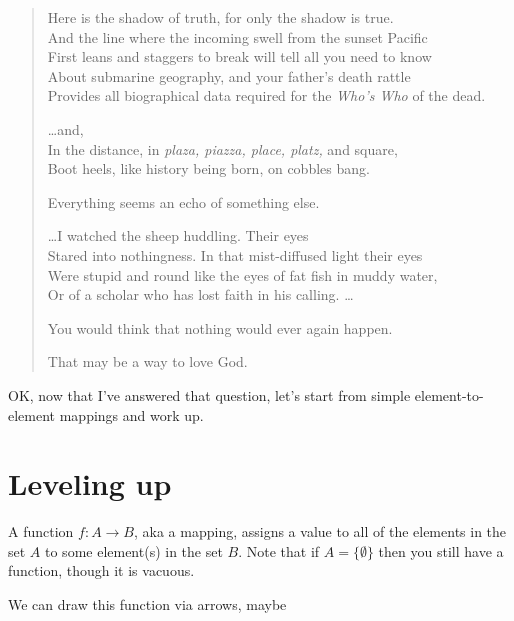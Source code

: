\documentclass[11pt]{article}
\begin{document}
\begin{verse}
Here is the shadow of truth, for only the shadow is true.\\
And the line where the incoming swell from the sunset Pacific\\
First leans and staggers to break will tell all you need to know\\
About submarine geography, and your father's death rattle\\
Provides all biographical data required for the {\em Who's Who} of the dead.

\dots and,\\
In the distance, in {\em plaza, piazza, place, platz,} and square,\\
Boot heels, like history being born, on cobbles bang.

Everything seems an echo of something else.

\dots I watched the sheep huddling.  Their eyes\\
Stared into nothingness.  In that mist-diffused light their eyes\\
Were stupid and round like the eyes of fat fish in muddy water,\\
Or of a scholar who has lost faith in his calling. \dots

You would think that nothing would ever again happen.

That may be a way to love God.
\end{verse}

OK, now that I've answered that question, let's start from simple element-to-element
mappings and work up.

\section{Leveling up}\label{levelsec}

A function $f:A\to B$, aka a mapping, assigns a value to all of the elements in the set $A$ to
some element(s) in the set $B$. Note that if $A=\{\emptyset\}$ then you still have a function, though
it is vacuous.

We can draw this function via arrows, maybe

\begin{center}
\end{center}
\end{document}
